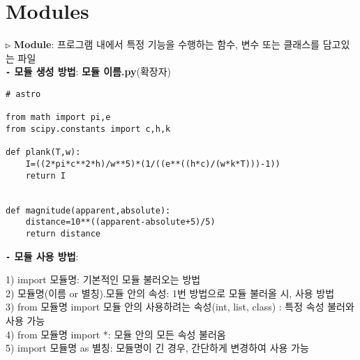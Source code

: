 \documentclass[11pt,a4paper]{article}
\begin{document}
\section{\LARGE\textbf{Modules}}
\texttt{▷} \textbf{Module}: 프로그램 내에서 특정 기능을 수행하는 함수, 변수 또는 클래스를 담고있는 파일\\
\textbf{\texttt{-} 모듈 생성 방법}: \textbf{모듈 이름.py}(확장자)
\begin{lstlisting}[label={list:first},caption=Modules]
# astro

from math import pi,e
from scipy.constants import c,h,k

def plank(T,w):
    I=((2*pi*c**2*h)/w**5)*(1/((e**((h*c)/(w*k*T)))-1))
    return I


def magnitude(apparent,absolute):
    distance=10**((apparent-absolute+5)/5)
    return distance
\end{lstlisting}

\textbf{\texttt{-} 모듈 사용 방법}:
\begin{spacing}{1.5}
\hspace*{2em}1) import 모듈명: 기본적인 모듈 불러오는 방법\\
\hspace*{2em}2) 모듈명(이름 or 별칭).모듈 안의 속성: 1번 방법으로 모듈 불러올 시, 사용 방법\\
\hspace*{2em}3) from 모듈명 import 모듈 안의 사용하려는 속성(int, list, class) : 특정 속성 불러와 사용 가능\\
\hspace*{2em}4) from 모듈명 import *: 모듈 안의 모든 속성 불러옴\\
\hspace*{2em}5) import 모듈명 as 별칭: 모듈명이 긴 경우, 간단하게 변경하여 사용  가능\\
\end{spacing}
\end{document}
